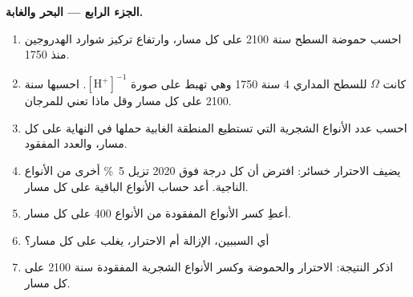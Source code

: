 \begin{problem}
\medskip
\noindent\textbf{الجزء الرابع --- البحر والغابة.}
\begin{enumerate}[resume]
  \item احسب حموضة السطح سنة 2100 على كل مسار، وارتفاع
        تركيز شوارد الهدروجين منذ 1750.
  \item كانت  $\Omega$ للسطح المداري
        4 سنة 1750 وهي تهبط على صورة $[\ensuremath{\mathrm{H^{+}}}]^{-1}$. احسبها سنة 2100
        على كل مسار وقل ماذا تعني للمرجان.
  \item احسب عدد الأنواع الشجرية التي تستطيع المنطقة الغابية
        حملها في النهاية على كل مسار، والعدد المفقود.
  \item يضيف الاحترار خسائر: افترض أن كل درجة فوق 2020 تزيل
        \qty{5}{\%} أخرى من الأنواع الناجية. أعد حساب
        الأنواع الباقية على كل مسار.
  \item أعطِ كسر الأنواع المفقودة من الأنواع 400 على كل مسار.
  \item أي السببين، الإزالة أم الاحترار، يغلب على
        كل مسار؟
  \item اذكر النتيجة: الاحترار والحموضة وكسر
        الأنواع الشجرية المفقودة سنة 2100 على كل مسار.
\end{enumerate}
\end{problem}
